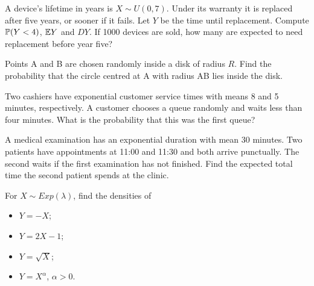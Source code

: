 \documentclass[a4paper]{report}
\begin{document}
\begin{problembook}
A device's lifetime in years is $X\sim U(0,7)$. Under its warranty it is replaced after five years, or sooner if it fails. Let $Y$ be the time until replacement. Compute $\P(Y<4)$, $\E Y$ and $DY$. If 1000 devices are sold, how many are expected to need replacement before year five?
\end{problembook}
\begin{problem}
Points A and B are chosen randomly inside a disk of radius $R$. Find the probability that the circle centred at A with radius AB lies inside the disk.
\end{problem}
\begin{problembook}
Two cashiers have exponential customer service times with means 8 and 5 minutes, respectively. A customer chooses a queue randomly and waits less than four minutes. What is the probability that this was the first queue?
\end{problembook}
\begin{problembook}
A medical examination has an exponential duration with mean 30 minutes. Two patients have appointments at 11:00 and 11:30 and both arrive punctually. The second waits if the first examination has not finished. Find the expected total time the second patient spends at the clinic.
\end{problembook}
\begin{problembook}
For $X\sim Exp(\lambda)$, find the densities of
\begin{itemize}\item $Y=-X$;\item $Y=2X-1$;\item $Y=\sqrt X$;\item $Y=X^\alpha$, $\alpha>0$.\end{itemize}
\end{problembook}
\end{document}
